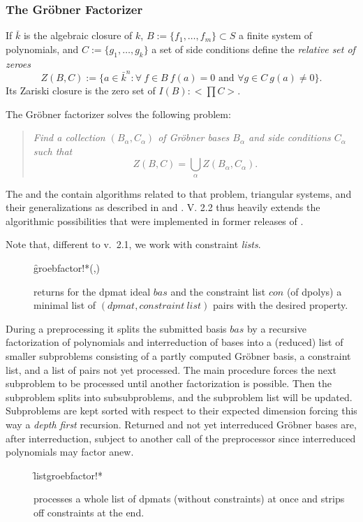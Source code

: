 \subsubsection{The Gr\"obner Factorizer}

If $\bar{k}$ is the algebraic closure of $k$,
$B:=\{f_1,\ldots,f_m\}\subset S$ a finite system of polynomials, and
$C:=\{g_1,\ldots,g_k\}$ a set of side conditions define the
\emph{relative set of zeroes}
\[Z(B,C):=\{a\in \bar{k}^n : \forall\ f\in B\ f(a)=0\mbox{ and }
\forall g\in C\ g(a)\neq 0\}.\]
Its Zariski closure is the zero set of $I(B):<\prod C>$.

The Gr\"obner factorizer solves the following problem:
\begin{quote}
\textit{Find a collection $(B_\alpha,C_\alpha)$ of Gr\"obner bases $B_\alpha$
and side conditions $C_\alpha$ such that}
\[Z(B,C) = \bigcup_\alpha Z(B_\alpha,C_\alpha).\]
\end{quote}
The  and the  contain algorithms
related to that problem, triangular systems, and their generalizations
as described in \cite{Graebe:94a} and \cite{Graebe:95b}. V. 2.2 thus heavily
extends the algorithmic possibilities that were implemented in former
releases of .

Note that, different to v.~2.1, we work with constraint \emph{lists}.
\begin{description}
\item[]
  \begin{syntax}
    \f{groebfactor!*}(,)
  \end{syntax}
  \hypertarget{procedure:GROEBFACTOR!*}{}
returns for the dpmat ideal $bas$ and the constraint list $con$
(of dpolys) a minimal list of $(dpmat, constraint\ list)$ pairs with
the desired property.
\end{description}
During a preprocessing it splits the submitted basis $bas$ by a
recursive factorization of polynomials and interreduction of bases
into a (reduced) list of smaller subproblems consisting of a partly
computed Gr\"obner basis, a constraint list, and a list of pairs not yet
processed. The main procedure forces the next subproblem to be
processed until another factorization is possible. Then the
subproblem splits into subsubproblems, and the subproblem list will
be updated. Subproblems are kept sorted with respect to their
expected dimension  forcing this way a \emph{depth first}
recursion.  Returned and not yet interreduced Gr\"obner bases are, after
interreduction, subject to another call of the preprocessor since
interreduced polynomials may factor anew.
\begin{description}
\item[]
  \begin{syntax}
    \f{listgroebfactor!*} 
  \end{syntax}
  \hypertarget{procedure:LISTGROEBFACTOR!*}{}
processes a whole list of dpmats (without constraints) at once and
strips off constraints at the end.
\end{description}
\medskip

